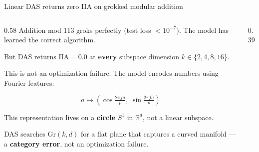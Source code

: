 \documentclass[aspectratio=169,11pt]{beamer}
\newcommand{\Gr}{\mathrm{Gr}}
\newcommand{\IIA}{\mathrm{IIA}}
\newcommand{\R}{\mathbb{R}}
\begin{document}
\begin{frame}{Linear DAS returns zero IIA on grokked modular addition}

\begin{columns}[T]
\begin{column}{0.58\textwidth}
{\small Addition mod 113 groks perfectly (test loss $< 10^{-7}$). The model has learned the correct algorithm.}

\vspace{0.3em}
{\small But DAS returns $\IIA = 0.0$ at \textbf{every} subspace dimension $k \in \{2, 4, 8, 16\}$.}

\vspace{0.3em}
{\small This is not an optimization failure. The model encodes numbers using Fourier features:}

\vspace{-4pt}
{\small $$a \mapsto (\cos \tfrac{2\pi f a}{p},\; \sin \tfrac{2\pi f a}{p})$$}

\vspace{-6pt}
{\small This representation lives on a \textbf{circle} $S^1$ in $\R^d$, not a linear subspace.}

\vspace{0.2em}
{\small DAS searches $\Gr(k,d)$ for a flat plane that captures a curved manifold --- a \textbf{category error}, not an optimization failure.}
\end{column}
\begin{column}{0.39\textwidth}
\end{column}
\end{columns}
\end{frame}
\end{document}
